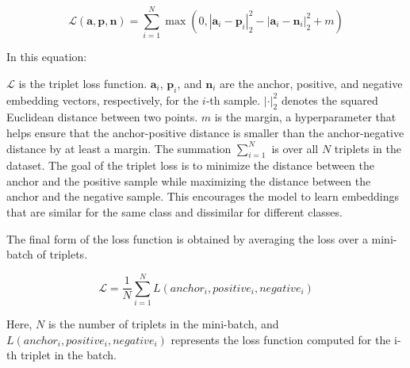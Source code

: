 \begin{equation}
\mathcal{L}(\mathbf{a}, \mathbf{p}, \mathbf{n}) = \sum_{i=1}^{N} \max \left(0, \left| \mathbf{a}_i - \mathbf{p}_i \right|_2^2 - \left| \mathbf{a}_i - \mathbf{n}_i \right|_2^2 + m \right)
\end{equation}

In this equation:

$\mathcal{L}$ is the triplet loss function.
$\mathbf{a}_i$, $\mathbf{p}_i$, and $\mathbf{n}_i$ are the anchor, positive, and negative embedding vectors, respectively, for the $i$-th sample.
$\left| \cdot \right|_2^2$ denotes the squared Euclidean distance between two points.
$m$ is the margin, a hyperparameter that helps ensure that the anchor-positive distance is smaller than the anchor-negative distance by at least a margin.
The summation $\sum_{i=1}^{N}$ is over all $N$ triplets in the dataset.
The goal of the triplet loss is to minimize the distance between the anchor and the positive sample while maximizing the distance between the anchor and the negative sample. This encourages the model to learn embeddings that are similar for the same class and dissimilar for different classes.

The final form of the loss function is obtained by averaging the loss over a mini-batch of triplets. 

\begin{equation}
\mathcal{L} = \frac{1}{N} \sum_{i=1}^{N} L(anchor_i, positive_i, negative_i)
\end{equation}

Here, $N$ is the number of triplets in the mini-batch, and $L(anchor_i, positive_i, negative_i)$ represents the loss function computed for the i-th triplet in the batch.